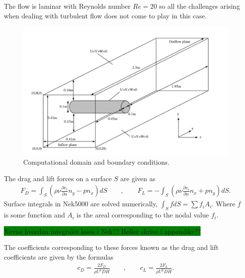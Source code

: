 The flow is laminar with Reynolds number $Re=20$ so all the 
challenges arising when dealing with turbulent flow does not come to play in this case. 
%
\begin{figure}[h]
    \centering
    \includegraphics[width = 1.0\textwidth]{Figures/cylinder.pdf}
    \caption{Computational domain and boundary conditions.}
    \label{fig:cylinder}
\end{figure}
%
The drag and lift forces on a surface $S$ are given as 
%
\begin{align}
    F_D = \int_{S}(\rho \nu \frac{\partial v_t}{\partial n}n_y-pn_x)dS 
    \qquad , \qquad
    F_L = -\int_{S}(\rho \nu \frac{\partial v_t}{\partial n}n_x+pn_y)dS.
    \label{eq:dragnlift}
\end{align}
%
Surface integrals in Nek5000 are solved numerically, $\int_S f dS = \sum f_i A_i$. Where $f$ is some function and $A_i$ is the areal corresponding
to the nodal value $f_i$. 

\colorbox{green}{Nevne hvordan integralet løses i Nek?? Heller skrive i appendiks??}

The coefficients corresponding to these forces known as the drag and lift coefficients 
are given by the formulas 
\begin{align}
    c_D = \frac{2F_D}{\rho U^2 D H}
    \qquad , \qquad
    c_L = \frac{2F_L}{\rho U^2 D H}.
    \label{eq:dragnliftcoeffs}
\end{align}


